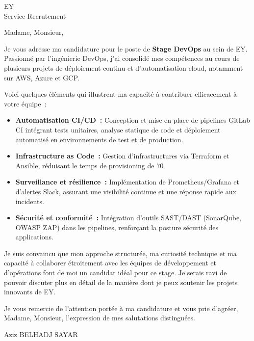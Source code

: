 \documentclass[11pt,a4paper]{letter}
\newcommand{\CandidateName}{Aziz BELHADJ SAYAR}
\newcommand{\CompanyName}{EY}
\newcommand{\Position}{Stage DevOps}
\begin{document}
\begin{letter}{\textcolor{companyblue}{\CompanyName}\\ Service Recrutement}

\opening{Madame, Monsieur,}

Je vous adresse ma candidature pour le poste de \textbf{\Position} au sein de \textcolor{companyblue}{\CompanyName}.  
Passionné par l’ingénierie DevOps, j’ai consolidé mes compétences au cours de plusieurs projets de déploiement continu et d’automatisation cloud, notamment sur AWS, Azure et GCP.  

Voici quelques éléments qui illustrent ma capacité à contribuer efficacement à votre équipe :

\begin{itemize}[leftmargin=*, label={--}]
  \item \textbf{Automatisation CI/CD :} Conception et mise en place de pipelines GitLab CI intégrant tests unitaires, analyse statique de code et déploiement automatisé en environnements de test et de production.  
  \item \textbf{Infrastructure as Code :} Gestion d’infrastructures via Terraform et Ansible, réduisant le temps de provisioning de 70 %
  \item \textbf{Surveillance et résilience :} Implémentation de Prometheus/Grafana et d’alertes Slack, assurant une visibilité continue et une réponse rapide aux incidents.  
  \item \textbf{Sécurité et conformité :} Intégration d’outils SAST/DAST (SonarQube, OWASP ZAP) dans les pipelines, renforçant la posture sécurité des applications.  
\end{itemize}

Je suis convaincu que mon approche structurée, ma curiosité technique et ma capacité à collaborer étroitement avec les équipes de développement et d’opérations font de moi un candidat idéal pour ce stage.  
Je serais ravi de pouvoir discuter plus en détail de la manière dont je peux soutenir les projets innovants de \textcolor{companyblue}{\CompanyName}.

Je vous remercie de l’attention portée à ma candidature et vous prie d’agréer, Madame, Monsieur, l’expression de mes salutations distinguées.

\closing{\CandidateName}

\end{letter}
\end{document}
